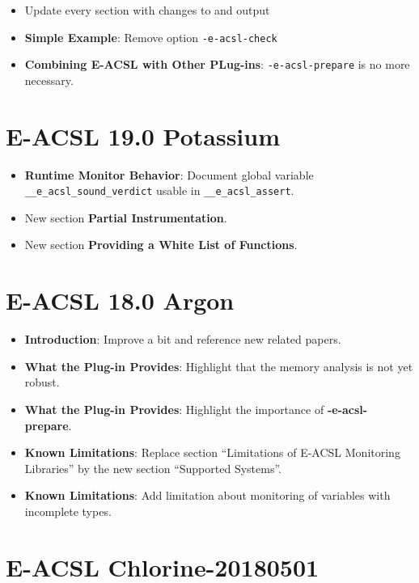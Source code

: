 \begin{itemize}
\item Update every section with changes to \framac and \eacslgcc output
\item \textbf{Simple Example}: Remove option \texttt{-e-acsl-check}
\item \textbf{Combining E-ACSL with Other PLug-ins}: \texttt{-e-acsl-prepare} is
  no more necessary.
\end{itemize}

\section*{E-ACSL 19.0 Potassium}

\begin{itemize}
\item \textbf{Runtime Monitor Behavior}: Document global variable
  \texttt{\_\_e\_acsl\_sound\_verdict} usable in \texttt{\_\_e\_acsl\_assert}.
\item New section \textbf{Partial Instrumentation}.
\item New section \textbf{Providing a White List of Functions}.
\end{itemize}

\section*{E-ACSL 18.0 Argon}

\begin{itemize}
\item \textbf{Introduction}: Improve a bit and reference new related papers.
\item \textbf{What the Plug-in Provides}: Highlight that the memory analysis is
  not yet robust.
\item \textbf{What the Plug-in Provides}: Highlight the importance of
  \textbf{-e-acsl-prepare}.
\item \textbf{Known Limitations}: Replace section ``Limitations of E-ACSL
  Monitoring Libraries'' by the new section ``Supported Systems''.
\item \textbf{Known Limitations}: Add limitation about monitoring of variables
  with incomplete types.
\end{itemize}

\section*{E-ACSL Chlorine-20180501}

